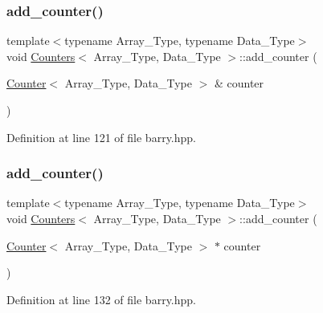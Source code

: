 \subsubsection{\texorpdfstring{add\+\_\+counter()}{add\_counter()}\hspace{0.1cm}{\footnotesize\ttfamily [1/3]}}
{\footnotesize\ttfamily template$<$typename Array\+\_\+\+Type, typename Data\+\_\+\+Type$>$ \\
void \hyperlink{classbarry_1_1_counters}{Counters}$<$ Array\+\_\+\+Type, Data\+\_\+\+Type $>$\+::add\+\_\+counter (\begin{DoxyParamCaption}\item[{\hyperlink{classbarry_1_1_counter}{Counter}$<$ Array\+\_\+\+Type, Data\+\_\+\+Type $>$ \&}]{counter }\end{DoxyParamCaption})\hspace{0.3cm}{\ttfamily [inline]}}



Definition at line 121 of file barry.\+hpp.

\mbox{\label{classbarry_1_1_counters_a74f054aa9ea64103c2d9f79f115777d4}} 
\subsubsection{\texorpdfstring{add\+\_\+counter()}{add\_counter()}\hspace{0.1cm}{\footnotesize\ttfamily [2/3]}}
{\footnotesize\ttfamily template$<$typename Array\+\_\+\+Type, typename Data\+\_\+\+Type$>$ \\
void \hyperlink{classbarry_1_1_counters}{Counters}$<$ Array\+\_\+\+Type, Data\+\_\+\+Type $>$\+::add\+\_\+counter (\begin{DoxyParamCaption}\item[{\hyperlink{classbarry_1_1_counter}{Counter}$<$ Array\+\_\+\+Type, Data\+\_\+\+Type $>$ $\ast$}]{counter }\end{DoxyParamCaption})\hspace{0.3cm}{\ttfamily [inline]}}



Definition at line 132 of file barry.\+hpp.

\mbox{\label{classbarry_1_1_counters_a4ee47504f9c76892c6028619e6b138ee}} 
